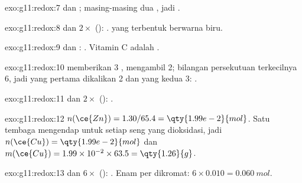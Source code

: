 \begin{solution}{exo:g11:redox:7}
 dan ; masing-masing
dua , jadi .
\end{solution}

\begin{solution}{exo:g11:redox:8}
 dan $2\times$ ():
.   yang terbentuk
berwarna biru.
\end{solution}

\begin{solution}{exo:g11:redox:9}
 dan :
. Vitamin C adalah .
\end{solution}

\begin{solution}{exo:g11:redox:10}
 memberikan 3 , 
mengambil 2; bilangan persekutuan terkecilnya 6, jadi yang pertama
dikalikan 2 dan yang kedua 3: .
\end{solution}

\begin{solution}{exo:g11:redox:11}
 dan $2\times$ ():
.
\end{solution}

\begin{solution}{exo:g11:redox:12}
$n(\ce{Zn}) = 1.30/65.4 = \qty{1.99e-2}{mol}$. Satu  tembaga
mengendap untuk setiap  seng yang dioksidasi, jadi
$n(\ce{Cu}) = \qty{1.99e-2}{mol}$
dan $m(\ce{Cu}) = 1.99\times 10^{-2} \times 63.5 = \qty{1.26}{g}$.
\end{solution}

\begin{solution}{exo:g11:redox:13}
 dan
$6\times$ ():
.
Enam  per  dikromat: $6 \times 0.010 = \qty{0.060}{mol}$.
\end{solution}


